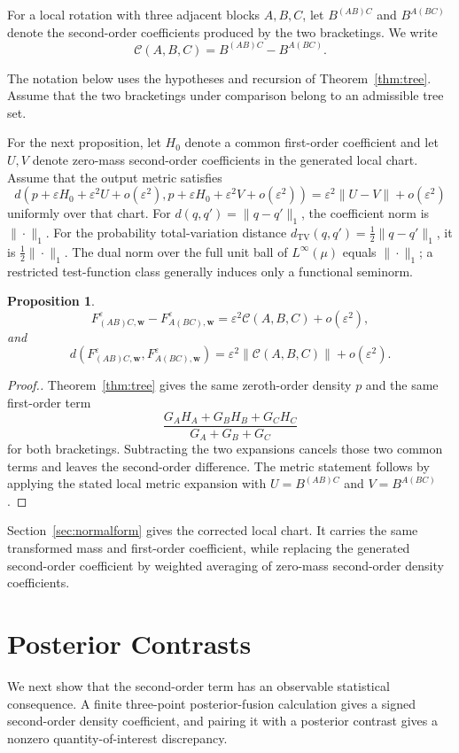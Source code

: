 \documentclass[11pt]{article}
\theoremstyle{plain}
\newtheorem{proposition}[theorem]{Proposition}
\theoremstyle{definition}
\theoremstyle{definition}
\newcommand{\eps}{\varepsilon}
\newcommand{\Curv}{\mathcal C}
\newcommand{\wv}{\mathbf w}
\newcommand{\Fw}[1]{F_{#1,\wv}^{\eps}}
\begin{document}
For a local rotation with three adjacent blocks $A,B,C$, let $B^{(AB)C}$ and $B^{A(BC)}$ denote the second-order coefficients produced by the two bracketings. We write
\[
\Curv(A,B,C)=B^{(AB)C}-B^{A(BC)}.
\]

The notation below uses the hypotheses and recursion of Theorem~\ref{thm:tree}. Assume that the two bracketings under comparison belong to an admissible tree set.

For the next proposition, let $H_0$ denote a common first-order coefficient and let $U,V$ denote zero-mass second-order coefficients in the generated local chart. Assume that the output metric satisfies
\[d(p+\eps H_0+\eps^2U+o(\eps^2),p+\eps H_0+\eps^2V+o(\eps^2))
=\eps^2\|U-V\|+o(\eps^2)
\]
uniformly over that chart. For $d(q,q')=\|q-q'\|_1$, the coefficient norm is $\|\cdot\|_1$. For the probability total-variation distance $d_{\mathrm{TV}}(q,q')=\frac12\|q-q'\|_1$, it is $\frac12\|\cdot\|_1$. The dual norm over the full unit ball of $L^\infty(\mu)$ equals $\|\cdot\|_1$; a restricted test-function class generally induces only a functional seminorm.

\begin{proposition}\label{prop:rotation}
\[
\Fw{(AB)C}-\Fw{A(BC)}=\eps^2\Curv(A,B,C)+o(\eps^2),
\]
and
\[
d(\Fw{(AB)C},\Fw{A(BC)})=\eps^2\|\Curv(A,B,C)\|+o(\eps^2).
\]
\end{proposition}

\begin{proof}[Proof.]
Theorem~\ref{thm:tree} gives the same zeroth-order density $p$ and the same first-order term
\[
\frac{G_AH_A+G_BH_B+G_CH_C}{G_A+G_B+G_C}
\]
for both bracketings. Subtracting the two expansions cancels those two common terms and leaves the second-order difference. The metric statement follows by applying the stated local metric expansion with $U=B^{(AB)C}$ and $V=B^{A(BC)}$.
\end{proof}

Section~\ref{sec:normalform} gives the corrected local chart. It carries the same transformed mass and first-order coefficient, while replacing the generated second-order coefficient by weighted averaging of zero-mass second-order density coefficients.


\section{Posterior Contrasts}\label{sec:consequences}

We next show that the second-order term has an observable statistical consequence. A finite three-point posterior-fusion calculation gives a signed second-order density coefficient, and pairing it with a posterior contrast gives a nonzero quantity-of-interest discrepancy.
\end{document}

